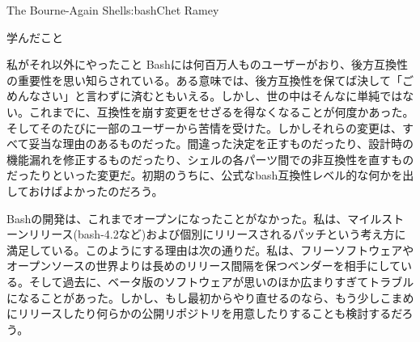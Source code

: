 \begin{aosachapter}{The Bourne-Again Shell}{s:bash}{Chet Ramey}
\begin{aosasect1}{学んだこと}
\begin{aosasect2}{私がそれ以外にやったこと}
Bashには何百万人ものユーザーがおり、後方互換性の重要性を思い知らされている。ある意味では、後方互換性を保てば決して「ごめんなさい」と言わずに済むともいえる。しかし、世の中はそんなに単純ではない。これまでに、互換性を崩す変更をせざるを得なくなることが何度かあった。そしてそのたびに一部のユーザーから苦情を受けた。しかしそれらの変更は、すべて妥当な理由のあるものだった。間違った決定を正すものだったり、設計時の機能漏れを修正するものだったり、シェルの各パーツ間での非互換性を直すものだったりといった変更だ。初期のうちに、公式なbash互換性レベル的な何かを出しておけばよかったのだろう。

Bashの開発は、これまでオープンになったことがなかった。私は、マイルストーンリリース(bash-4.2など)および個別にリリースされるパッチという考え方に満足している。このようにする理由は次の通りだ。私は、フリーソフトウェアやオープンソースの世界よりは長めのリリース間隔を保つベンダーを相手にしている。そして過去に、ベータ版のソフトウェアが思いのほか広まりすぎてトラブルになることがあった。しかし、もし最初からやり直せるのなら、もう少しこまめにリリースしたり何らかの公開リポジトリを用意したりすることも検討するだろう。


\end{aosasect2}
\end{aosasect1}
\end{aosachapter}
